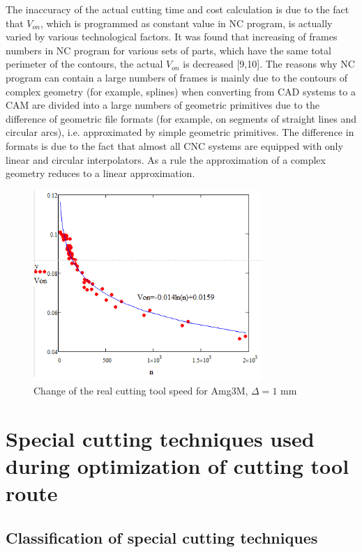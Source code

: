 \documentclass[runningheads]{llncs}
\begin{document}
The inaccuracy of the actual cutting time and cost calculation is due to the fact that $V_{on}$,
which is programmed as constant value in NC program,
is actually varied by various technological factors.
It was found that increasing of frames numbers in NC program
for various sets of parts,
which have the same total perimeter of the contours,
the actual $V_{on}$ is decreased [9,10].
The reasons why NC program can contain a large numbers of frames
is mainly due to the contours of complex geometry (for example, splines)
when converting from CAD systems to a CAM
are divided into a large numbers of geometric primitives
due to the difference of geometric file formats
(for example, on segments of straight lines and circular arcs),
i.e. approximated by simple geometric primitives.
The difference in formats is due to the fact that
almost all CNC systems are equipped with only linear and circular interpolators.
As a rule the approximation of a complex geometry reduces to a linear approximation.

\begin{figure}
  \begin{center}
  \includegraphics[width=0.77\textwidth]{plot.png}
  \caption{Change of the real cutting tool speed for Amg3M, $\Delta=1$ mm}
  \label{plot}
  \end{center}
\end{figure}


\section{Special cutting techniques used during optimization of cutting tool route}

\subsection{Classification of special cutting techniques}
\end{document}
